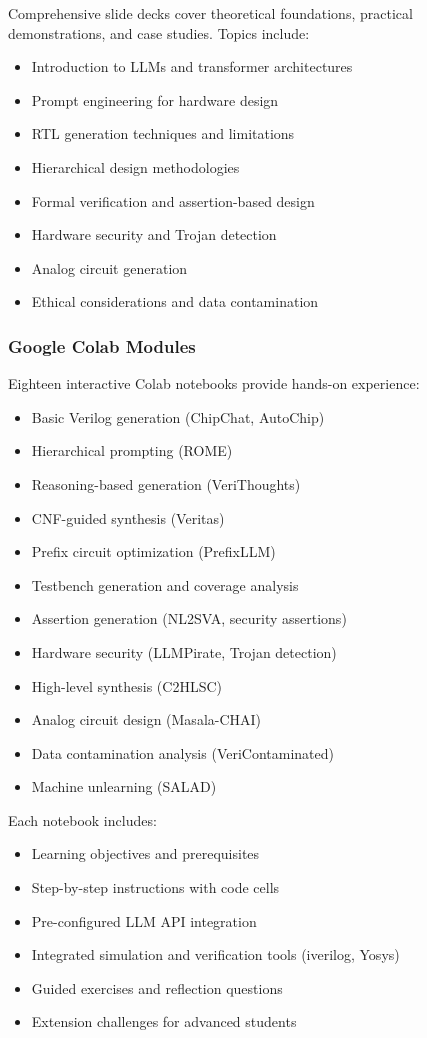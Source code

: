 \documentclass[10pt,conference]{IEEEtran}
\begin{document}
Comprehensive slide decks cover theoretical foundations, practical demonstrations, and case studies. Topics include:
\begin{itemize}
    \item Introduction to LLMs and transformer architectures
    \item Prompt engineering for hardware design
    \item RTL generation techniques and limitations
    \item Hierarchical design methodologies
    \item Formal verification and assertion-based design
    \item Hardware security and Trojan detection
    \item Analog circuit generation
    \item Ethical considerations and data contamination
\end{itemize}

\subsubsection{Google Colab Modules}

Eighteen interactive Colab notebooks provide hands-on experience:
\begin{itemize}
    \item Basic Verilog generation (ChipChat, AutoChip)
    \item Hierarchical prompting (ROME)
    \item Reasoning-based generation (VeriThoughts)
    \item CNF-guided synthesis (Veritas)
    \item Prefix circuit optimization (PrefixLLM)
    \item Testbench generation and coverage analysis
    \item Assertion generation (NL2SVA, security assertions)
    \item Hardware security (LLMPirate, Trojan detection)
    \item High-level synthesis (C2HLSC)
    \item Analog circuit design (Masala-CHAI)
    \item Data contamination analysis (VeriContaminated)
    \item Machine unlearning (SALAD)
\end{itemize}

Each notebook includes:
\begin{itemize}
    \item Learning objectives and prerequisites
    \item Step-by-step instructions with code cells
    \item Pre-configured LLM API integration
    \item Integrated simulation and verification tools (iverilog, Yosys)
    \item Guided exercises and reflection questions
    \item Extension challenges for advanced students
\end{itemize}
\end{document}
